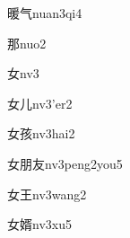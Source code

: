 \begin{verbete}[13;4]{暖气}{nuan3qi4}
\end{verbete}
\begin{verbete*}[6]{那}{nuo2}
\end{verbete*}
\begin{verbete}[3]{女}{nv3}
\end{verbete}
\begin{verbete}[3;2]{女儿}{nv3'er2}
\end{verbete}
\begin{verbete}[3;9]{女孩}{nv3hai2}
\end{verbete}
\begin{verbete}[3;8;4]{女朋友}{nv3peng2you5}
\end{verbete}
\begin{verbete}[3;4]{女王}{nv3wang2}
\end{verbete}
\begin{verbete}[3;12]{女婿}{nv3xu5}
\end{verbete}

